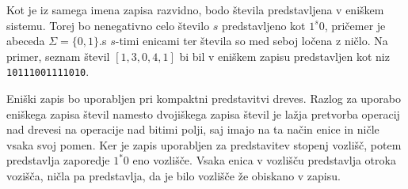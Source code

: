 Kot je iz samega imena zapisa razvidno, bodo števila predstavljena v eniškem sistemu. Torej bo nenegativno celo število $s$ predstavljeno kot $1^s0$, pričemer je abeceda $\Sigma=\{0,1\}$.s $s$-timi enicami ter števila so med seboj ločena z ničlo. Na primer, seznam števil $[1,3,0,4,1]$ bi bil v eniškem zapisu predstavljen kot niz \texttt{10111001111010}.

Eniški zapis bo uporabljen pri kompaktni predstavitvi dreves. Razlog za uporabo eniškega zapisa števil namesto dvojiškega zapisa števil je lažja pretvorba operacij nad drevesi na operacije nad bitimi polji, saj imajo na ta način enice in ničle vsaka svoj pomen. Ker je zapis uporabljen za predstavitev stopenj vozlišč, potem predstavlja zaporedje $1^*0$ eno vozlišče. Vsaka enica v vozlišču predstavlja otroka vozišča, ničla pa predstavlja, da je bilo vozlišče že obiskano v zapisu.

